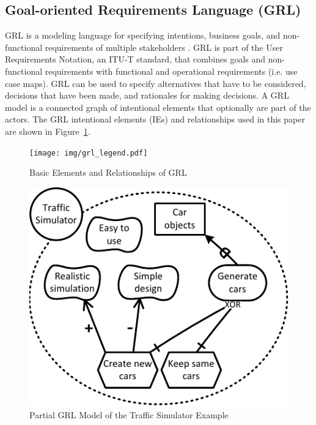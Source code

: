 \subsection{Goal-oriented Requirements Language (GRL)}
\label{sect:background:grl}
GRL is a modeling language for specifying intentions, business goals, and non-functional requirements of multiple stakeholders \cite{Amyot:2010:EGM:1841349.1841356}. GRL is part of the User Requirements Notation, an ITU-T standard, that combines goals and non-functional requirements with functional and operational requirements (i.e. use case maps). GRL can be used to specify alternatives that have to be considered, decisions that have been made, and rationales for making decisions. A GRL model is a connected graph of intentional elements that optionally are part of the actors. The GRL intentional elements (IEs) and relationships used in this paper are shown in Figure~\ref{fig:grl_legend}.

\begin{figure}[ht]
\centering
\texttt{[image: img/grl\_legend.pdf]}
\caption{Basic Elements and Relationships of GRL}
\label{fig:grl_legend}
\end{figure}


\begin{figure}[b]
\centering
\includegraphics[width=\columnwidth]{img/Example1.pdf}
\caption{Partial GRL Model of the Traffic Simulator Example}
\label{fig:example-small}
\end{figure} 


